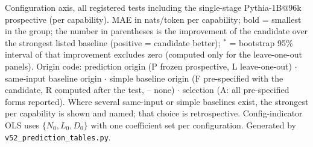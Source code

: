 \begin{table}[p]
\caption{Configuration axis, all registered tests including the single-stage Pythia-1B@96k prospective (per capability). MAE in nats/token per capability; bold = smallest in the group; the number in parentheses is the improvement of the candidate over the strongest listed baseline (positive = candidate better); $^{*}$ = bootstrap 95\% interval of that improvement excludes zero (computed only for the leave-one-out panels). Origin code: prediction origin (P frozen prospective, L leave-one-out) $\cdot$ same-input baseline origin $\cdot$ simple baseline origin (F pre-specified with the candidate, R computed after the test, -- none) $\cdot$ selection (A: all pre-specified forms reported). Where several same-input or simple baselines exist, the strongest per capability is shown and named; that choice is retrospective. Config-indicator OLS uses $\{N_0,L_0,D_0\}$ with one coefficient set per configuration. Generated by \texttt{v52\_prediction\_tables.py}.}
\label{tab:pred_config_full}\end{table}
